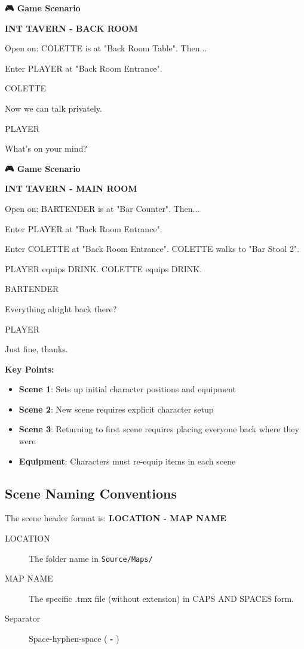 \documentclass[11pt,letterpaper,oldstylefigures]{memoir}
\newcommand{\slugline}[1]{\nobreak\textbf{\MakeUppercase{#1}}\par\nobreak\vspace{1\baselineskip}}
\newcommand{\speaker}[1]{\nobreak\hspace*{0.333\textwidth}\MakeUppercase{#1}\par\nobreak\vspace{0.5\baselineskip}}
\newcommand{\dialogue}[1]{\nobreak\hspace*{0.25\textwidth}\begin{minipage}{0.5\textwidth}#1\end{minipage}\par\vspace{1\baselineskip}}
\newcommand{\stagedir}[1]{#1\par\vspace{1\baselineskip}}
\newenvironment{FountainExample}
  {\begingroup
  \ttfamily\small
   \setlength{\parindent}{0pt}
  \setlength{\parskip}{0.5em}
  \allowdisplaybreaks
  \setlength{\displaywidowpenalty}{0}
  \setlength{\widowpenalty}{0}
  \setlength{\clubpenalty}{0}
  \setlength{\interlinepenalty}{0}
}
  {\endgroup}
\newenvironment{GameScenario}
{\begingroup
\small
\setlength{\parindent}{0pt}
\setlength{\parskip}{0.5em}
\allowdisplaybreaks
\setlength{\displaywidowpenalty}{0}
\setlength{\widowpenalty}{0}
\setlength{\clubpenalty}{0}
\setlength{\interlinepenalty}{0}
\begin{tcolorbox}[
    colback=orange!5,
    colframe=orange!75!black,
    boxrule=0.5pt,
    arc=2pt,
    left=0.5em,
    right=0.5em,
    top=0.25em,
    bottom=0.25em
]
\textbf{🎮 Game Scenario}
\end{tcolorbox}\par
}
{\endgroup}
\newcommand{\paragraphbreak}{\vspace{0.5em}}
\newcommand{\fountain}[1]{\textbf{#1}}
\begin{document}
\begin{GameScenario}
\begin{FountainExample}
\slugline{INT TAVERN - BACK ROOM}

\stagedir{Open on: COLETTE is at "Back Room Table". Then...}
\stagedir{Enter PLAYER at "Back Room Entrance".}

\speaker{COLETTE}
\dialogue{Now we can talk privately.}

\speaker{PLAYER}
\dialogue{What's on your mind?}
\end{FountainExample}
\end{GameScenario}

\begin{GameScenario}
\begin{FountainExample}
\slugline{INT TAVERN - MAIN ROOM}

\stagedir{Open on: BARTENDER is at "Bar Counter". Then...}
\stagedir{Enter PLAYER at "Back Room Entrance".}
\stagedir{Enter COLETTE at "Back Room Entrance". COLETTE walks to "Bar Stool 2".}
\stagedir{PLAYER equips DRINK. COLETTE equips DRINK.}

\speaker{BARTENDER}
\dialogue{Everything alright back there?}

\speaker{PLAYER}
\dialogue{Just fine, thanks.}
\end{FountainExample}
\end{GameScenario}

\textbf{Key Points:}
\begin{itemize}
\item \textbf{Scene 1}: Sets up initial character positions and equipment
\item \textbf{Scene 2}: New scene requires explicit character setup
\item \textbf{Scene 3}: Returning to first scene requires placing everyone back where they were
\item \textbf{Equipment}: Characters must re-equip items in each scene
\end{itemize}

\subsection{Scene Naming Conventions}
\paragraphbreak

The scene header format is: \fountain{LOCATION - MAP NAME}

\begin{description}
\item[LOCATION] The folder name in \texttt{Source/Maps/}
\item[MAP NAME] The specific .tmx file (without extension) in CAPS AND SPACES form.
\item[Separator] Space-hyphen-space (\fountain{ - })
\end{description}
\end{document}
